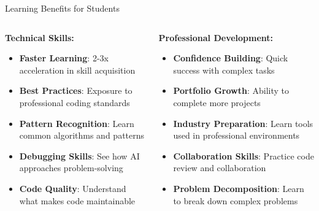 \documentclass{beamer}
\begin{document}
\begin{frame}[t]{Learning Benefits for Students}
    \begin{columns}
        \begin{column}{0.5\textwidth}
            \textbf{Technical Skills:}
            \begin{itemize}
                \item \textbf{Faster Learning}: 2-3x acceleration in skill acquisition
                \item \textbf{Best Practices}: Exposure to professional coding standards
                \item \textbf{Pattern Recognition}: Learn common algorithms and patterns
                \item \textbf{Debugging Skills}: See how AI approaches problem-solving
                \item \textbf{Code Quality}: Understand what makes code maintainable
            \end{itemize}
        \end{column}
        \begin{column}{0.5\textwidth}
            \textbf{Professional Development:}
            \begin{itemize}
                \item \textbf{Confidence Building}: Quick success with complex tasks
                \item \textbf{Portfolio Growth}: Ability to complete more projects
                \item \textbf{Industry Preparation}: Learn tools used in professional environments
                \item \textbf{Collaboration Skills}: Practice code review and collaboration
                \item \textbf{Problem Decomposition}: Learn to break down complex problems
            \end{itemize}
        \end{column}
    \end{columns}
\end{frame}
\end{document}
